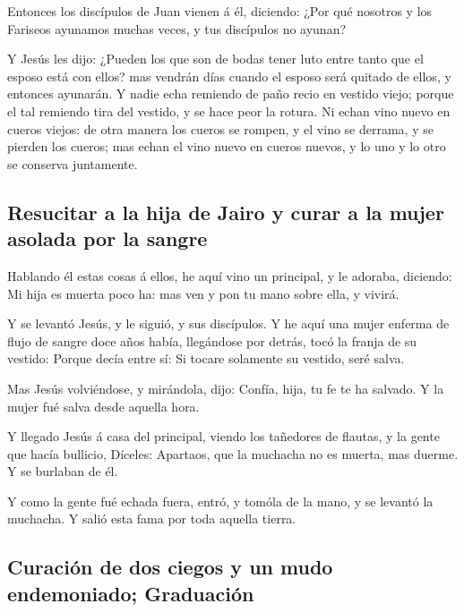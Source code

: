  Entonces los discípulos de Juan vienen á él, diciendo:
¿Por qué nosotros y los Fariseos ayunamos muchas veces, y tus discípulos
no ayunan?

 Y Jesús les dijo: ¿Pueden los que son de bodas tener luto
entre tanto que el esposo está con ellos? mas vendrán días cuando el
esposo será quitado de ellos, y entonces ayunarán.  Y nadie
echa remiendo de paño recio en vestido viejo; porque el tal remiendo
tira del vestido, y se hace peor la rotura.  Ni echan vino
nuevo en cueros viejos: de otra manera los cueros se rompen, y el vino
se derrama, y se pierden los cueros; mas echan el vino nuevo en cueros
nuevos, y lo uno y lo otro se conserva juntamente.

\hypertarget{resucitar-a-la-hija-de-jairo-y-curar-a-la-mujer-asolada-por-la-sangre}{%
\subsection{Resucitar a la hija de Jairo y curar a la mujer asolada por
la
sangre}\label{resucitar-a-la-hija-de-jairo-y-curar-a-la-mujer-asolada-por-la-sangre}}

 Hablando él estas cosas á ellos, he aquí vino un
principal, y le adoraba, diciendo: Mi hija es muerta poco ha: mas ven y
pon tu mano sobre ella, y vivirá.

 Y se levantó Jesús, y le siguió, y sus discípulos.
 Y he aquí una mujer enferma de flujo de sangre doce años
había, llegándose por detrás, tocó la franja de su vestido:
 Porque decía entre sí: Si tocare solamente su vestido,
seré salva.

 Mas Jesús volviéndose, y mirándola, dijo: Confía, hija, tu
fe te ha salvado. Y la mujer fué salva desde aquella hora.

 Y llegado Jesús á casa del principal, viendo los tañedores
de flautas, y la gente que hacía bullicio,  Díceles:
Apartaos, que la muchacha no es muerta, mas duerme. Y se burlaban de él.

 Y como la gente fué echada fuera, entró, y tomóla de la
mano, y se levantó la muchacha.  Y salió esta fama por toda
aquella tierra.

\hypertarget{curaciuxf3n-de-dos-ciegos-y-un-mudo-endemoniado-graduaciuxf3n}{%
\subsection{Curación de dos ciegos y un mudo endemoniado;
Graduación}\label{curaciuxf3n-de-dos-ciegos-y-un-mudo-endemoniado-graduaciuxf3n}}

